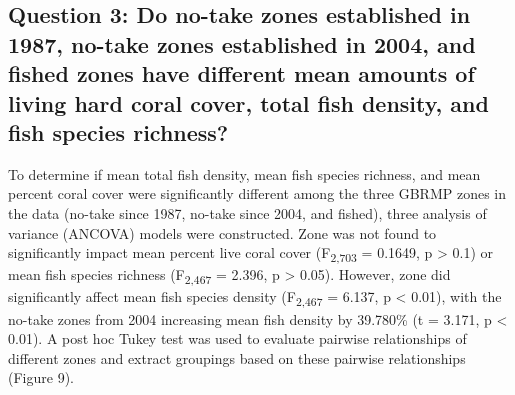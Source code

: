 \documentclass[12pt,]{article}
\begin{document}
\hypertarget{question-3-do-no-take-zones-established-in-1987-no-take-zones-established-in-2004-and-fished-zones-have-different-mean-amounts-of-living-hard-coral-cover-total-fish-density-and-fish-species-richness}{%
\subsection{Question 3: Do no-take zones established in 1987, no-take
zones established in 2004, and fished zones have different mean amounts
of living hard coral cover, total fish density, and fish species
richness?}\label{question-3-do-no-take-zones-established-in-1987-no-take-zones-established-in-2004-and-fished-zones-have-different-mean-amounts-of-living-hard-coral-cover-total-fish-density-and-fish-species-richness}}

To determine if mean total fish density, mean fish species richness, and
mean percent coral cover were significantly different among the three
GBRMP zones in the data (no-take since 1987, no-take since 2004, and
fished), three analysis of variance (ANCOVA) models were constructed.
Zone was not found to significantly impact mean percent live coral cover
(F\textsubscript{2,703} = 0.1649, p \textgreater{} 0.1) or mean fish
species richness (F\textsubscript{2,467} = 2.396, p \textgreater{}
0.05). However, zone did significantly affect mean fish species density
(F\textsubscript{2,467} = 6.137, p \textless{} 0.01), with the no-take
zones from 2004 increasing mean fish density by 39.780\% (t = 3.171, p
\textless{} 0.01). A post hoc Tukey test was used to evaluate pairwise
relationships of different zones and extract groupings based on these
pairwise relationships (Figure 9).
\end{document}
